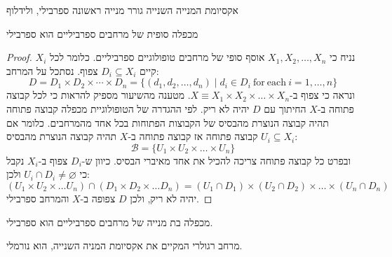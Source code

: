 \documentclass{tstextbook}
\begin{document}
\begin{corollary}
אקסיומת המנייה השנייה גורר מנייה ראשונה ספרבילי, ולידלוף

\end{corollary}
\begin{proposition}
מכפלה סופית של מרחבים ספרביליים הוא ספרבילי

\end{proposition}
\begin{proof}
נניח כי \(X_{1},X_{2},\dots ,X_{n}\) אוסף סופי של מרחבים טופולוגיים ספרביליים.  כלומר לכל \(X_{i}\) קיים \(D_{i}\subseteq X_{i}\) צפוף.
נסתכל על המרחב:
$$D=D_{1}\times D_{2}\times\cdots\times D_{n}=\{(d_{1},d_{2},\ldots,d_{n})\mid d_{i}\in D_{i}{\mathrm{~for~each~}}i=1,\ldots,n\}$$
ונראה כי צפוף ב-\(X\equiv X_{1}\times X_{2}\times\dots \times X_{n}\). מטענה מהשיעור מספיק להראות כי לכל קבוצה פתוחה ב-\(X\) החיתוך עם \(D\) יהיה לא ריק. לפי ההגדרה של הטופולוגיית מכפלה קבוצה פתוחה תהיה קבוצה הנוצרת מהבסיס של הקבוצות הפתוחות בכל אחד מהמרחבים. כלומר אם \(U_{i}\subseteq X_{i}\) קבוצה פתוחה אז קבוצה פתוחה ב-\(X\) תהיה קבוצה הנוצרת מהבסיס:
$$\mathcal{B} =\{ U_{1}\times U_{2}\times \dots \times U_{n} \}$$
ובפרט כל קבוצה פתוחה צריכה להכיל את אחד מאיברי הבסיס. כיוון ש-\(D_{i}\) צפוף ב-\(X_{i}\) נקבל כי \(U_{i}\cap D_{i}\neq \varnothing\) ולכן:
$$(U_{1}\times U_{2}\times\dots U_{n})\cap  (D_{1}\times D_{2}\times\dots D_{n})=(U_{1}\cap  D_{1})\times (U_{2}\cap  D_{2})\times\dots \times (U_{n}\cap  D_{n})$$
יהיה לא ריק, ולכן \(D\) צפופה ב-\(X\) והמרחב ספרבילי.

\end{proof}
\begin{proposition}
מכפלה בת מנייה של מרחבים ספרביליים הוא ספרבילי.

\end{proposition}
\begin{proposition}
מרחב רגולרי המקיים את אקסיומת המניה השנייה, הוא נורמלי.

\end{proposition}
\end{document}
